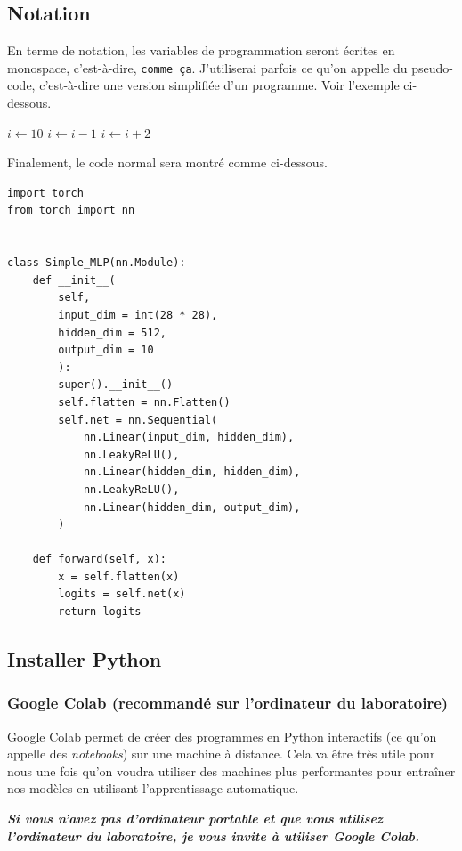 \documentclass[titlepage]{article}
\theoremstyle{cleanremark}
\begin{document}
\subsection{Notation}\label{subsec_1.1:notation}
En terme de notation, les variables de programmation seront écrites en monospace, c'est-à-dire, \texttt{comme ça}. J'utiliserai parfois ce qu'on appelle du pseudo-code, c'est-à-dire une version simplifiée d'un programme. Voir l'exemple ci-dessous.

\begin{algorithm}
$i\gets 10$\;
{
    $i\gets i-1$\;
}{
    {
        $i\gets i+2$\;
    }
}
\end{algorithm}

\noindent Finalement, le code normal sera montré comme ci-dessous. 
\begin{verbatim}
import torch
from torch import nn


class Simple_MLP(nn.Module):
    def __init__(
        self, 
        input_dim = int(28 * 28), 
        hidden_dim = 512, 
        output_dim = 10
        ):
        super().__init__()
        self.flatten = nn.Flatten()
        self.net = nn.Sequential(
            nn.Linear(input_dim, hidden_dim),
            nn.LeakyReLU(),
            nn.Linear(hidden_dim, hidden_dim),
            nn.LeakyReLU(),
            nn.Linear(hidden_dim, output_dim),
        )

    def forward(self, x):
        x = self.flatten(x)
        logits = self.net(x)
        return logits
\end{verbatim}

\subsection{Installer Python}
\subsubsection{Google Colab (recommandé sur l'ordinateur du laboratoire)}
Google Colab permet de créer des programmes en Python interactifs (ce qu'on appelle des \textit{notebooks}) sur une machine à distance. Cela va être très utile pour nous une fois qu'on voudra utiliser des machines plus performantes pour entraîner nos modèles en utilisant l'apprentissage automatique.
\begin{center}
\textbf{\textit{Si vous n'avez pas d'ordinateur portable et que vous utilisez l'ordinateur du laboratoire, je vous invite à utiliser Google Colab.}}
\end{center}
\end{document}
